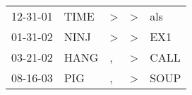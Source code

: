 \begin{supertabular}{p{0.07\textwidth}p{0.06\textwidth}p{0.02\textwidth}p{0.02\textwidth}p{0.06\textwidth}}
 12-31-01\textsuperscript{} &  TIME\textsuperscript{} &  \textgreater &  \textgreater &   als\textsuperscript{} \\
 01-31-02\textsuperscript{} &  NINJ\textsuperscript{} &  \textgreater &  \textgreater &   EX1\textsuperscript{} \\
 03-21-02\textsuperscript{} &  HANG\textsuperscript{} &             , &  \textgreater &  CALL\textsuperscript{} \\
 08-16-03\textsuperscript{} &   PIG\textsuperscript{} &             , &  \textgreater &  SOUP\textsuperscript{} \\
\end{supertabular}
